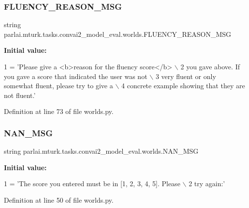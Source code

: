 \subsubsection{\texorpdfstring{F\+L\+U\+E\+N\+C\+Y\+\_\+\+R\+E\+A\+S\+O\+N\+\_\+\+M\+SG}{FLUENCY\_REASON\_MSG}}
{\footnotesize\ttfamily string parlai.\+mturk.\+tasks.\+convai2\+\_\+model\+\_\+eval.\+worlds.\+F\+L\+U\+E\+N\+C\+Y\+\_\+\+R\+E\+A\+S\+O\+N\+\_\+\+M\+SG}

{\bfseries Initial value\+:}
\begin{DoxyCode}
1 =  \textcolor{stringliteral}{'Please give a <b>reason for the fluency score</b> \(\backslash\)}
2 \textcolor{stringliteral}{        you gave above. If you gave a score that indicated the user was not \(\backslash\)}
3 \textcolor{stringliteral}{        very fluent or only somewhat fluent, please try to give a \(\backslash\)}
4 \textcolor{stringliteral}{        concrete example showing that they are not fluent.'}
\end{DoxyCode}


Definition at line 73 of file worlds.\+py.

\mbox{\label{namespaceparlai_1_1mturk_1_1tasks_1_1convai2__model__eval_1_1worlds_a30941c4a8072bfa76a91b9341bddef22}} 
\subsubsection{\texorpdfstring{N\+A\+N\+\_\+\+M\+SG}{NAN\_MSG}}
{\footnotesize\ttfamily string parlai.\+mturk.\+tasks.\+convai2\+\_\+model\+\_\+eval.\+worlds.\+N\+A\+N\+\_\+\+M\+SG}

{\bfseries Initial value\+:}
\begin{DoxyCode}
1 =  \textcolor{stringliteral}{'The score you entered must be in [1, 2, 3, 4, 5]. Please \(\backslash\)}
2 \textcolor{stringliteral}{        try again:'}
\end{DoxyCode}


Definition at line 50 of file worlds.\+py.

\mbox{\label{namespaceparlai_1_1mturk_1_1tasks_1_1convai2__model__eval_1_1worlds_ab47521325f4bc4eef70e45ed8276f159}} 
